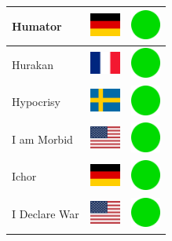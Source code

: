 \documentclass[12pt, a4paper, twoside]{report}
\begin{document}
\begin{center}
\begin{longtable}{|p{5cm}|p{2cm}|p{2cm}|}
 Humator                                                    & \includegraphics[width=1cm]{../4x3/de} &   \includegraphics[width=1cm]{../likes/y} \\ \hline
 Hurakan                                                    & \includegraphics[width=1cm]{../4x3/fr} &   \includegraphics[width=1cm]{../likes/y} \\ \hline
 Hypocrisy                                                  & \includegraphics[width=1cm]{../4x3/se} &   \includegraphics[width=1cm]{../likes/y} \\ \hline
 I am Morbid                                                & \includegraphics[width=1cm]{../4x3/us} &   \includegraphics[width=1cm]{../likes/y} \\ \hline
 Ichor                                                      & \includegraphics[width=1cm]{../4x3/de} &   \includegraphics[width=1cm]{../likes/y} \\ \hline
 I Declare War                                              & \includegraphics[width=1cm]{../4x3/us} &   \includegraphics[width=1cm]{../likes/y} \\ \hline

\end{longtable}
\end{center}
\end{document}

